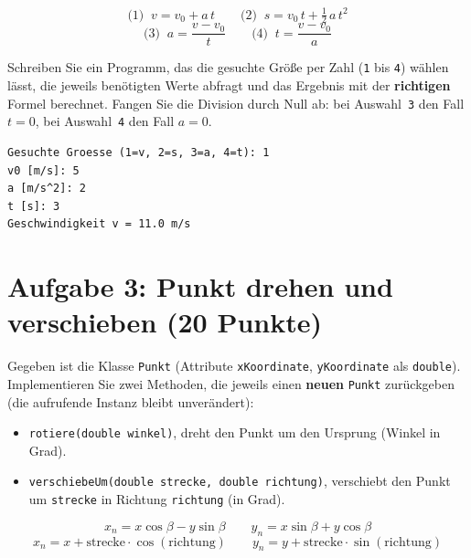 \documentclass[
	fontsize=12pt,
	paper=a4,
	numbers=noenddot,
	parskip=half,
	openany
]{scrbook}
\begin{document}
\begin{formeln}
\[
	\text{(1)}\;\; v = v_0 + a\,t
	\qquad
	\text{(2)}\;\; s = v_0\,t + \tfrac{1}{2}\,a\,t^2
\]
\[
	\text{(3)}\;\; a = \frac{v - v_0}{t}
	\qquad
	\text{(4)}\;\; t = \frac{v - v_0}{a}
\]
\end{formeln}

Schreiben Sie ein Programm, das die gesuchte Größe per Zahl (\texttt{1} bis \texttt{4}) wählen lässt, die jeweils benötigten Werte abfragt und das Ergebnis mit der \textbf{richtigen} Formel berechnet.
Fangen Sie die Division durch Null ab: bei Auswahl~\texttt{3} den Fall $t = 0$, bei Auswahl~\texttt{4} den Fall $a = 0$.

\begin{beispiel}[Beispieldialog]
\begin{lstlisting}[language={}]
Gesuchte Groesse (1=v, 2=s, 3=a, 4=t): 1
v0 [m/s]: 5
a [m/s^2]: 2
t [s]: 3
Geschwindigkeit v = 11.0 m/s
\end{lstlisting}
\end{beispiel}

\clearpage
\section*{Aufgabe 3: Punkt drehen und verschieben \hfill (20 Punkte)}

Gegeben ist die Klasse \texttt{Punkt} (Attribute \texttt{xKoordinate}, \texttt{yKoordinate} als \texttt{double}).
Implementieren Sie zwei Methoden, die jeweils einen \textbf{neuen} \texttt{Punkt} zurückgeben (die aufrufende Instanz bleibt unverändert):

\begin{itemize}[nosep]
	\item \texttt{rotiere(double winkel)}, dreht den Punkt um den Ursprung (Winkel in Grad).
	\item \texttt{verschiebeUm(double strecke, double richtung)}, verschiebt den Punkt um \texttt{strecke} in Richtung \texttt{richtung} (in Grad).
\end{itemize}

\begin{formeln}
\[
	x_n = x\cos\beta - y\sin\beta \qquad y_n = x\sin\beta + y\cos\beta
\]
\[
	x_n = x + \text{strecke}\cdot\cos(\text{richtung}) \qquad
	y_n = y + \text{strecke}\cdot\sin(\text{richtung})
\]
\end{formeln}
\end{document}
